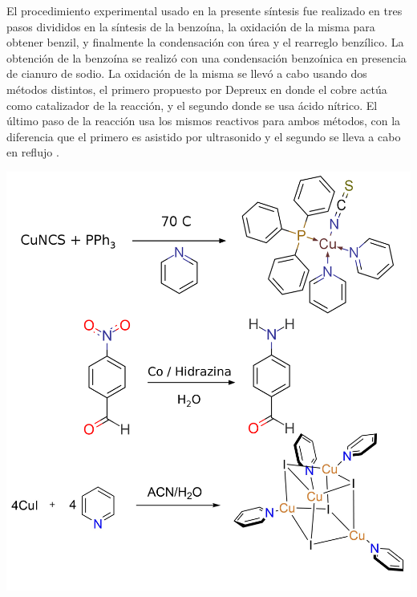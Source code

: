 \documentclass[fleqn,10pt]{SelfArx}
\begin{document}
El procedimiento experimental usado en la presente s\'intesis fue realizado en tres pasos divididos en la s\'intesis de la benzo\'ina, la oxidaci\'on de la misma para obtener benzil, y finalmente la condensaci\'on con \'urea y el rearreglo benz\'ilico. La obtenci\'on de la benzo\'ina se realiz\'o con una condensaci\'on benzo\'inica en presencia de cianuro de sodio. La oxidaci\'on de la misma se llev\'o a cabo usando dos m\'etodos distintos, el primero propuesto por Depreux \cite{depreux1988} en donde el cobre act\'ua como catalizador de la reacci\'on, y el segundo donde se usa \'acido n\'itrico. El \'ultimo paso de la reacci\'on usa los mismos reactivos para ambos m\'etodos, con la diferencia que el primero es asistido por ultrasonido y el segundo se lleva a cabo en reflujo \cite{safari2010}.
\begin{scheme}[h]
	\centering
	\caption{S\'intesis del Dilantin con las dos rutas seguidas en el laboratorio.}
	\includegraphics[width=\linewidth]{structures/complete.png}
\end{scheme}


\newpage
\end{document}

